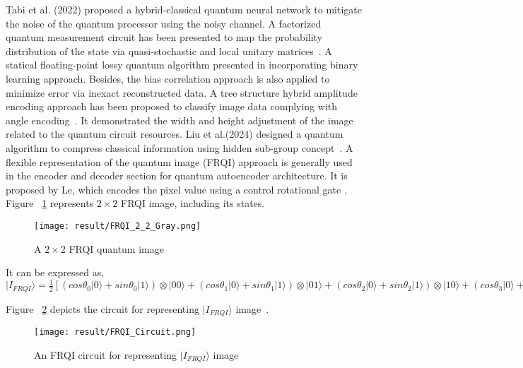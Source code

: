 Tabi et al. (2022)  proposed a hybrid-classical quantum neural network to mitigate the noise of the quantum processor using the noisy channel. A factorized quantum measurement circuit has been presented to map the probability distribution of the state via quasi-stochastic and local unitary matrices~\cite{carrasquilla2021probabilistic}. A statical floating-point lossy quantum algorithm presented in \cite{yoon2022lossy} incorporating binary learning approach. Besides, the bias correlation approach is also applied to minimize error via inexact reconstructed data. A tree structure hybrid amplitude encoding approach has been proposed to classify image data complying with angle encoding~\cite{gong2024quantum}. It demonstrated the width and height adjustment of the image related to the quantum circuit resources. Liu et al.(2024) designed a quantum algorithm to compress classical information using hidden sub-group concept~\cite{liu2024information}. A flexible representation of the quantum image (FRQI) approach is generally used in the encoder and decoder section for quantum autoencoder architecture. It is proposed by Le, which encodes the pixel value using a control rotational gate \cite{le2011flexible}. Figure ~\ref{FRQI_A} represents $2\times2$ FRQI image, including its states. 
\begin{figure}[htbp]
\centerline{\texttt{[image: result/FRQI\_2\_2\_Gray.png]}}
\caption{A $2\times2$ FRQI quantum image}
\label{FRQI_A}
\end{figure}
It can be expressed as, \\

\begin{math}
|I_{FRQI}\rangle=\frac{1}{2}[\left(cos\theta_{0}|0\rangle +sin\theta_{0}|1\rangle \right) \otimes |00\rangle 
+\left(cos\theta_{1}|0\rangle+sin\theta_{1}|1\rangle \right)\otimes|01\rangle +  \left(cos\theta_{2}|0\rangle+sin\theta_{2}|1\rangle \right)\otimes|10\rangle+ \left(cos\theta_{3}|0\rangle+sin\theta_{3}|1\rangle \right)\otimes|11\rangle ]\nonumber
\end{math}

Figure ~\ref{FRQI_Circuit} depicts the circuit for representing   $|I_{FRQI}\rangle$ image~\cite{le2011flexible}. 

\begin{figure}[t!]
\centerline{\texttt{[image: result/FRQI\_Circuit.png]}}
\caption{An FRQI circuit for representing $|I_{FRQI}\rangle$ image}
\label{FRQI_Circuit}
\end{figure}

